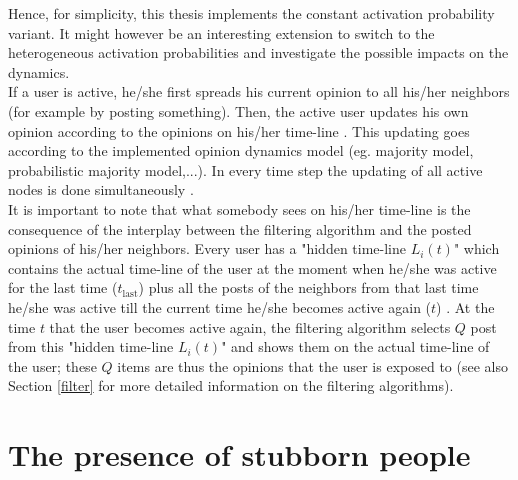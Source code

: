 \documentclass[11 pt , letterpaper , twoside , openright]{book}
\begin{document}
Hence, for simplicity, this thesis implements the constant activation probability variant. It might however be an interesting extension to switch to the heterogeneous activation probabilities and investigate the possible impacts on the dynamics. \\
\newline
If a user is active, he/she first spreads his current opinion to all his/her neighbors (for example by posting something). Then, the active user updates his own opinion according to the opinions on his/her time-line \cite{Perra2019}. This updating goes according to the implemented opinion dynamics model (eg. majority model, probabilistic majority model,...). In every time step the updating of all active nodes is done simultaneously \cite{Perra2019}.\\
It is important to note that what somebody sees on his/her time-line is the consequence of the interplay between the filtering algorithm and the posted opinions of his/her neighbors. Every user has a "hidden time-line $L_i(t)$" which contains the actual time-line of the user at the moment when he/she was active for the last time ($t_{\text{last}}$) plus all the posts of the neighbors from that last time he/she was active till the current time he/she becomes active again ($t$) \cite{Perra2019}. At the time $t$ that the user becomes active again, the filtering algorithm selects $Q$ post from this "hidden time-line $L_i(t)$" and shows them on the actual time-line of the user; these $Q$ items are thus the opinions that the user is exposed to \cite{Perra2019} (see also Section \ref{filter} for more detailed information on the filtering algorithms).



\newpage
\section{The presence of stubborn people}\label{stubb}
\end{document}

